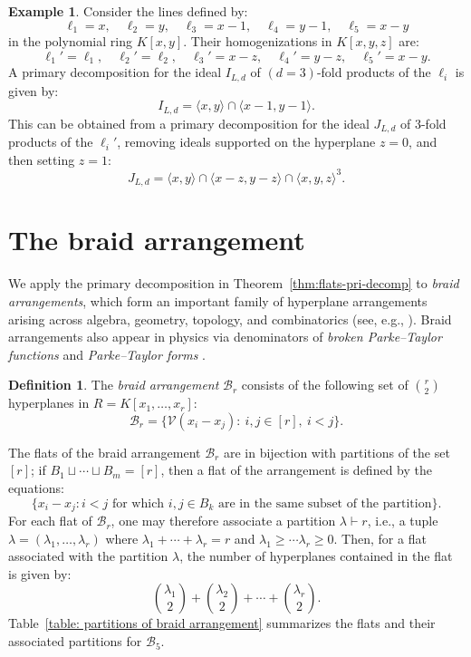 \documentclass [a4paper,reqno, 11pt]{amsart}
\theoremstyle{plain}
\theoremstyle{plain}
\theoremstyle{plain}
\theoremstyle{plain}
\theoremstyle{definition}
\newtheorem{definition}[theorem]{Definition}
\theoremstyle{definition}
\newtheorem{example}[theorem]{Example}
\theoremstyle{definition}
\theoremstyle{definition}
\theoremstyle{definition}
\theoremstyle{definition}
\newcommand{\calV}{\mathcal{V}}
\begin{document}
\begin{example}
    Consider the lines defined by:
    \[\ell_1=x,\quad\ell_2= y, \quad \ell_3=x-1,\quad \ell_4=y-1,\quad \ell_5=x-y\]
    in the polynomial ring $K[x,y]$. Their homogenizations in $K[x,y,z]$ are:
    \[\ell_1'=\ell_1,\quad\ell_2'=\ell_2,\quad\ell_3'=x-z,\quad\ell_4'=y-z,\quad\ell_5'=x-y.\]
    A primary decomposition for the ideal $I_{L,d}$ of $(d=3)$-fold products of the $\ell_i$ is given by:
    \[I_{L,d}=\langle x,y\rangle\cap\langle x-1,y-1\rangle.\]
    This can be obtained from a primary decomposition for the ideal $J_{L,d}$ of $3$-fold products of the $\ell_i'$, removing ideals supported on the hyperplane $z=0$, and then setting $z=1$:
    \[J_{L,d}=\langle x,y\rangle\cap\langle x-z,y-z\rangle\cap\langle x,y,z\rangle^3.\]
\end{example}


\section{The braid arrangement}\label{sec:braid}


We apply the primary decomposition in Theorem~\ref{thm:flats-pri-decomp} to \emph{braid arrangements}, which form an important family of hyperplane arrangements arising across algebra, geometry, topology, and combinatorics (see, e.g., \cite{Fei}). Braid arrangements also appear in physics via denominators of \emph{broken Parke--Taylor functions} \cite{Fro} and \emph{Parke--Taylor forms} \cite{BEPV}.

\begin{definition}
The \textit{braid arrangement} $\mathcal{B}_r$ consists of the following set of $\binom{r}{2}$ hyperplanes in $R=K[x_1,\ldots,x_r]$:
\[\mathcal{B}_r=\{\calV(x_i-x_j): \ i,j\in[r], \ i<j\}.\] 
\end{definition}

The flats of the braid arrangement $\mathcal{B}_r$ are in bijection with partitions of the set $[r]$; if $B_1\sqcup\cdots\sqcup B_m=[r]$, then a flat of the arrangement is defined by the equations:
\[\{x_i-x_j:\text{$i<j$ for which $i,j\in B_k$ are in the same subset of the partition}\}.\]
For each flat of $\mathcal{B}_r$, one may therefore associate a partition $\lambda\vdash r$, i.e., a tuple $\lambda=(\lambda_1,\ldots,\lambda_r)$ where $\lambda_1+\cdots+\lambda_r=r$ and $\lambda_1\geq\cdots\lambda_r\geq 0$. Then, for a flat associated with the partition $\lambda$, the number of hyperplanes contained in the flat is given by:
\[\binom{\lambda_1}{2}+\binom{\lambda_2}{2}+\cdots+\binom{\lambda_r}{2}.\]
Table~\ref{table: partitions of braid arrangement} summarizes the flats and their associated partitions for $\mathcal{B}_5$.
\end{document}
